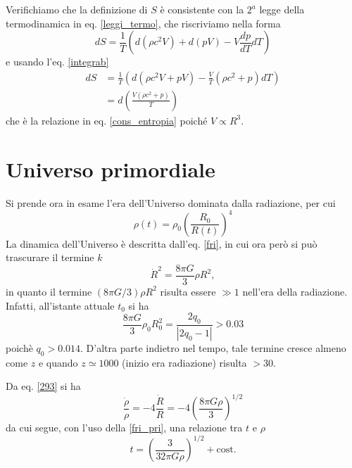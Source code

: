 Verifichiamo che la definizione di $S$ è consistente con la $2^a$ legge della
termodinamica in eq. \eqref{leggi_termo}, che riscriviamo nella forma
\begin{equation}
  dS  = \frac{1}{T} \left( d(\rho c^2 V) + d(pV) - V \frac{dp}{dT} dT \right)
\end{equation}
e usando l'eq. \eqref{integrab}
\begin{equation}
  \begin{split}
    dS &= \frac{1}{T} \left( d(\rho c^2 V + pV) -  \frac{V}{T}   (\rho c^2 +p)
      dT  \right) \\
    &= d \left( \frac{V (\rho c^2 + p)} {T}  \right)
  \end{split}
\end{equation}
che è la relazione in eq. \eqref{cons_entropia} poiché $V \propto R^3$.

\section{Universo primordiale}

Si prende ora in esame l'era dell'Universo dominata dalla radiazione, per cui
\begin{equation}
  \rho(t)=\rho_0 \left(\frac{R_0}{R(t)} \right)^4
  \label{293}
\end{equation}
La dinamica dell'Universo è descritta dall'eq. \eqref{fri}, in cui ora però si
può trascurare il termine $k$
\begin{equation}
  \dot{R}^2 = \frac{8 \pi G}{3} \rho R^2,
  \label{fri_pri}
\end{equation}
in quanto il termine $(8 \pi G /3) \rho R^2$ risulta essere $\gg 1$ nell'era
della radiazione.  Infatti, all'istante attuale $t_0$ si ha
\begin{equation}
  \frac{8 \pi G}{3} \rho_0 R^2_0 = \frac{2q_0}{|2q_0-1|} > 0.03
\end{equation}
poichè $q_0>0.014$.  D'altra parte indietro nel tempo, tale termine cresce
almeno come $z$ e quando $z\simeq 1000$ (inizio era radiazione) risulta $>30$.

Da eq. \eqref{293} si ha
\begin{equation}
  \frac{\dot \rho}{\rho} = -4 \frac{\dot R}{R} = - 4 \left( \frac{8 \pi G
      \rho}{3} \right)^{1/2}
\end{equation}
da cui segue, con l'uso della \eqref{fri_pri}, una relazione tra $t$ e $\rho$
\begin{equation}
  t = \left( \frac{3}{32 \pi G \rho} \right)^{1/2} + \text{cost}.
  \label{tvsrho}
\end{equation}

